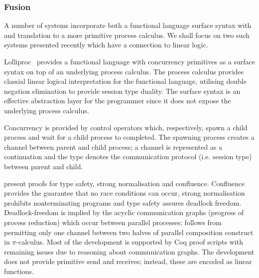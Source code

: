 \documentclass{mprop}
\begin{document}
\subsubsection{Fusion}

A number of systems incorporate both a functional language surface syntax with and translation to a more primitive process calculus. We shall focus on two such systems presented recently which have a connection to linear logic.

Lolliproc~\cite{Mazurak:2010:LCC} provides a functional language with concurrency primitives as a surface syntax on top of an underlying process calculus. The process calculus provides classial linear logical interpretation for the functional language, utilising double negation elimination to provide session type duality. The surface syntax is an effective abstraction layer for the programmer since it does not expose the underlying process calculus.

Concurrency is provided by control operators which, respectively, spawn a child process and wait for a child process to completed. The spawning process creates a channel between parent and child process; a channel is represented as a continuation and the type denotes the communication protocol (i.e. session type) between parent and child.

\citeauthor{Mazurak:2010:LCC} present proofs for type safety, strong normalisation and confluence. Confluence provides the guarantee that no race conditions can occur, strong normalisation prohibits nonterminating programs and type safety assures deadlock freedom. Deadlock-freedom is implied by the acyclic communication graphs (progress of process reduction) which occur between parallel processes; follows from permitting only one channel between two halves of parallel composition construct in $\pi$-calculus. Most of the development is supported by Coq proof scripts with remaining issues due to reasoning about communication graphs. The development does not provide primitive send and receives; instead, these are encoded as linear functions. 
\end{document}
